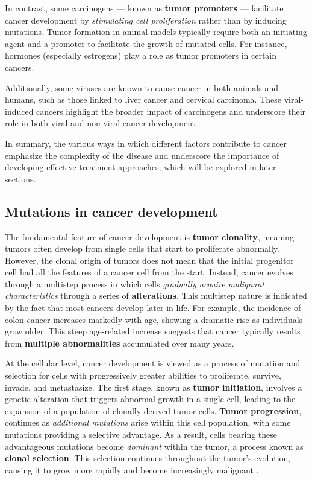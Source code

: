 In contrast, some carcinogens --- known as \textbf{tumor promoters} --- facilitate cancer development by \textit{stimulating cell proliferation} rather than by inducing mutations. Tumor formation in animal models typically require both an initiating agent and a promoter to facilitate the growth of mutated cells. For instance, hormones (especially estrogens) play a role as tumor promoters in certain cancers.

Additionally, some viruses are known to cause cancer in both animals and humans, such as those linked to liver cancer and cervical carcinoma. These viral-induced cancers highlight the broader impact of carcinogens and underscore their role in both viral and non-viral cancer development \cite{nih_cancer_dev}.

In summary, the various ways in which different factors contribute to cancer emphasize the complexity of the disease and underscore the importance of developing effective treatment approaches, which will be explored in later sections.

\subsection{Mutations in cancer development}

The fundamental feature of cancer development is \textbf{tumor clonality}, meaning tumors often develop from single cells that start to proliferate abnormally. However, the clonal origin of tumors does not mean that the initial progenitor cell had all the features of a cancer cell from the start. Instead, cancer evolves through a multistep process in which cells \textit{gradually acquire malignant characteristics} through a series of \textbf{alterations}. This multistep nature is indicated by the fact that most cancers develop later in life. For example, the incidence of colon cancer increases markedly with age, showing a dramatic rise as individuals grow older. This steep age-related increase suggests that cancer typically results from \textbf{multiple abnormalities} accumulated over many years.

At the cellular level, cancer development is viewed as a process of mutation and selection for cells with progressively greater abilities to proliferate, survive, invade, and metastasize. The first stage, known as \textbf{tumor initiation}, involves a genetic alteration that triggers abnormal growth in a single cell, leading to the expansion of a population of clonally derived tumor cells. \textbf{Tumor progression}, continues as \textit{additional mutations} arise within this cell population, with some mutations providing a selective advantage. As a result, cells bearing these advantageous mutations become \textit{dominant} within the tumor, a process known as \textbf{clonal selection}. This selection continues throughout the tumor's evolution, causing it to grow more rapidly and become increasingly malignant \cite{nih_cancer_dev}.

